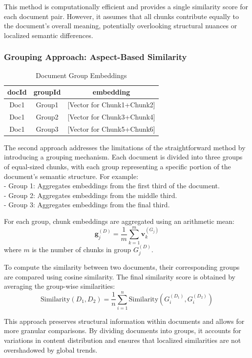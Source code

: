 \documentclass[12pt]{article}
\begin{document}
This method is computationally efficient and provides a single similarity score for each document pair. However, it assumes that all chunks contribute equally to the document's overall meaning, potentially overlooking structural nuances or localized semantic differences.

\subsubsection{Grouping Approach: Aspect-Based Similarity}
\begin{table}[h!]
    \centering
    \caption{Document Group Embeddings}
    \begin{tabular}{|c|c|c|}
        \hline
        \textbf{docId} & \textbf{groupId} & \textbf{embedding} \\
        \hline
        Doc1 & Group1 & [Vector for Chunk1+Chunk2] \\
        Doc1 & Group2 & [Vector for Chunk3+Chunk4] \\
        Doc1 & Group3 & [Vector for Chunk5+Chunk6] \\
        \hline
    \end{tabular}
\end{table}

The second approach addresses the limitations of the straightforward method by introducing a grouping mechanism. Each document is divided into three groups of equal-sized chunks, with each group representing a specific portion of the document's semantic structure. For example:\\
- Group 1: Aggregates embeddings from the first third of the document.\\
- Group 2: Aggregates embeddings from the middle third.\\
- Group 3: Aggregates embeddings from the final third.

For each group, chunk embeddings are aggregated using an arithmetic mean:
\[
\mathbf{g}_j^{(D)} = \frac{1}{m} \sum_{k=1}^{m} \mathbf{v}_k^{(G_j)}
\]
where \(m\) is the number of chunks in group \(G_j^{(D)}\).

To compute the similarity between two documents, their corresponding groups are compared using cosine similarity. The final similarity score is obtained by averaging the group-wise similarities:
\[
\text{Similarity}(D_1, D_2) = \frac{1}{n} \sum_{i=1}^{n} \text{Similarity}(G_i^{(D_1)}, G_i^{(D_2)})
\]


This approach preserves structural information within documents and allows for more granular comparisons. By dividing documents into groups, it accounts for variations in content distribution and ensures that localized similarities are not overshadowed by global trends.
\end{document}
